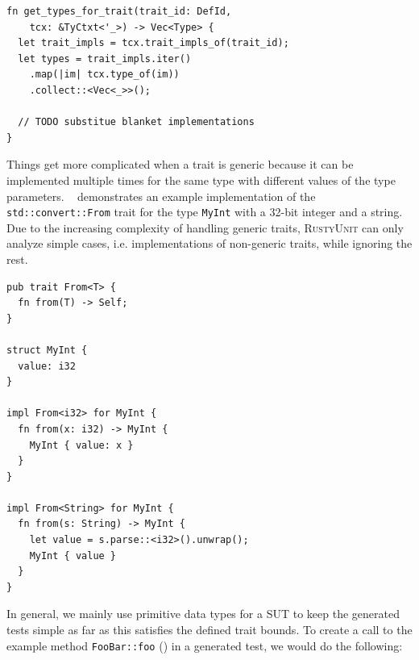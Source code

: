 \documentclass[paper=a4,%
  twoside,%
  BCOR4mm,%
  abstract=true,%
  toc=bibliography,%
  chapterprefix=true,%
  toc=bibliographynumbered,%
  open=right,%
  english,%
  pagesize=pdftex]{scrreprt}
\newcommand{\tech}{\textsc{RustyUnit}\xspace}
\begin{document}
\begin{lstlisting}[style=boxed, caption={Query types for a trait}, label=lst:query-types-that-implement-trait]
fn get_types_for_trait(trait_id: DefId, 
    tcx: &TyCtxt<'_>) -> Vec<Type> {
  let trait_impls = tcx.trait_impls_of(trait_id);
  let types = trait_impls.iter()
    .map(|im| tcx.type_of(im))
    .collect::<Vec<_>>();

  // TODO substitue blanket implementations
}
\end{lstlisting}

Things get more complicated when a trait is generic because it can be implemented multiple times for the same type with different values of the type parameters. ~ demonstrates an example implementation of the \texttt{std::convert::From} trait for the type \texttt{MyInt} with a 32-bit integer and a string. Due to the increasing complexity of handling generic traits, \tech can only analyze simple cases, i.e. implementations of non-generic traits, while ignoring the rest.

\begin{lstlisting}[style=boxed, caption={Example implementation oft the std::convert::From trait from the Rust standard library}, label=lst:from-trait-example]
pub trait From<T> {
  fn from(T) -> Self;
}

struct MyInt {
  value: i32
}

impl From<i32> for MyInt {
  fn from(x: i32) -> MyInt {
    MyInt { value: x }
  }
}

impl From<String> for MyInt {
  fn from(s: String) -> MyInt {
    let value = s.parse::<i32>().unwrap();
    MyInt { value }
  }
}
\end{lstlisting}


In general, we mainly use primitive data types for a \ac{SUT} to keep the generated tests simple as far as this satisfies the defined trait bounds. To create a call to the example method \texttt{FooBar::foo} () in a generated test, we would do the following:
\end{document}
